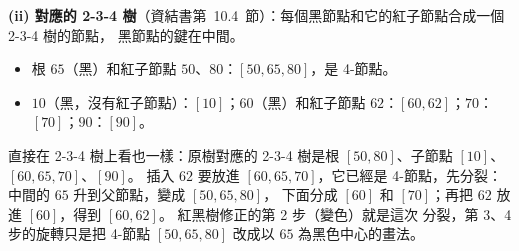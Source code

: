 \begin{pastsoln}
\textbf{(ii) 對應的 2-3-4 樹}（資結書第~10.4~節）：每個黑節點和它的紅子節點合成一個 2-3-4 樹的節點，
黑節點的鍵在中間。
\begin{itemize}
\item 根 $65$（黑）和紅子節點 $50$、$80$：$[50, 65, 80]$，是 4-節點。
\item $10$（黑，沒有紅子節點）：$[10]$；$60$（黑）和紅子節點 $62$：$[60, 62]$；$70$：$[70]$；$90$：$[90]$。
\end{itemize}
\begin{center}
\end{center}
直接在 2-3-4 樹上看也一樣：原樹對應的 2-3-4 樹是根 $[50, 80]$、子節點 $[10]$、$[60, 65, 70]$、$[90]$。
插入 $62$ 要放進 $[60, 65, 70]$，它已經是 4-節點，先分裂：中間的 $65$ 升到父節點，變成 $[50, 65, 80]$，
下面分成 $[60]$ 和 $[70]$；再把 $62$ 放進 $[60]$，得到 $[60, 62]$。 紅黑樹修正的第 2 步（變色）就是這次
分裂，第 3、4 步的旋轉只是把 4-節點 $[50, 65, 80]$ 改成以 $65$ 為黑色中心的畫法。
\end{pastsoln}

